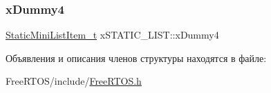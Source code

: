 \mbox{\label{structx_s_t_a_t_i_c___l_i_s_t_aafa5f9d67d7f3636f2d1f8c372e75ecf}} 
\subsubsection{\texorpdfstring{xDummy4}{xDummy4}}
{\footnotesize\ttfamily \mbox{\hyperlink{_free_r_t_o_s_8h_a9097f48f4dfa56e8e01d9179462c7994}{Static\+Mini\+List\+Item\+\_\+t}} x\+S\+T\+A\+T\+I\+C\+\_\+\+L\+I\+S\+T\+::x\+Dummy4}



Объявления и описания членов структуры находятся в файле\+:\begin{DoxyCompactItemize}
\item 
Free\+R\+T\+O\+S/include/\mbox{\hyperlink{_free_r_t_o_s_8h}{Free\+R\+T\+O\+S.\+h}}\end{DoxyCompactItemize}
